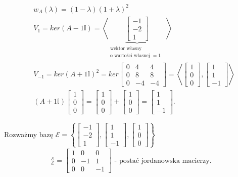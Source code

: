 \documentclass[../main.tex]{subfiles}
\begin{document}
\begin{przyklad}
\begin{align*}
    &w_{A}(\lambda) = (1-\lambda)(1+\lambda)^2\\
    &V_1 = ker(A- 1 \mathbb{I}) = \left<\underbrace{\begin{bmatrix} -1\\-2\\1 \end{bmatrix}}_{\substack{\text{wektor własny }\\ \text{o wartości własnej $=1$ }}}  \right>\\
    &V_{-1} = ker(A + 1 \mathbb{I})^2 = ker \begin{bmatrix} 0&4&4\\0&8&8\\0&-4&-4 \end{bmatrix} = \left<\begin{bmatrix} 1\\0\\0 \end{bmatrix}, \begin{bmatrix} 1\\1\\-1 \end{bmatrix}   \right>\\
    &(A+1\mathbb{I})\begin{bmatrix} 1\\0\\0 \end{bmatrix} = \begin{bmatrix} 1\\0\\0 \end{bmatrix} + \begin{bmatrix} 1\\0\\0 \end{bmatrix} = \begin{bmatrix} 1\\1\\-1 \end{bmatrix}
.\end{align*}

Rozważmy bazę $\mathcal{E} = \left\{ \begin{bmatrix} -1\\-2\\1 \end{bmatrix} ,\begin{bmatrix} 1\\1\\-1 \end{bmatrix} , \begin{bmatrix} 1\\0\\0 \end{bmatrix}  \right\}$
\begin{align*}
    [A]_{\mathcal{E}}^{\mathcal{E}} = \begin{bmatrix} 1 & 0 & 0\\ 0 & -1 & 1\\ 0 & 0 & -1\end{bmatrix} \text{ - postać jordanowska macierzy}
.\end{align*}
\end{przyklad}
\end{document}
